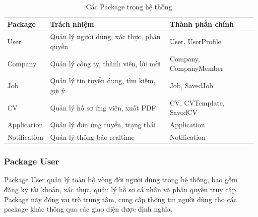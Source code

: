 \begin{table}[H]
\centering
\caption{Các Package trong hệ thống}
\label{tab:packages}
\begin{tabular}{|p{3cm}|p{5cm}|p{4cm}|}
\hline
\textbf{Package} & \textbf{Trách nhiệm} & \textbf{Thành phần chính} \\
\hline
User & Quản lý người dùng, xác thực, phân quyền & User, UserProfile \\
\hline
Company & Quản lý công ty, thành viên, lời mời & Company, CompanyMember \\
\hline
Job & Quản lý tin tuyển dụng, tìm kiếm, gợi ý & Job, SavedJob \\
\hline
CV & Quản lý hồ sơ ứng viên, xuất PDF & CV, CVTemplate, SavedCV \\
\hline
Application & Quản lý đơn ứng tuyển, trạng thái & Application \\
\hline
Notification & Quản lý thông báo realtime & Notification \\
\hline
\end{tabular}
\end{table}

%
%
%
%
%

\subsubsection{Package User}

Package User quản lý toàn bộ vòng đời người dùng trong hệ thống, bao gồm đăng ký tài khoản, xác thực, quản lý hồ sơ cá nhân và phân quyền truy cập. Package này đóng vai trò trung tâm, cung cấp thông tin người dùng cho các package khác thông qua các giao diện được định nghĩa.

